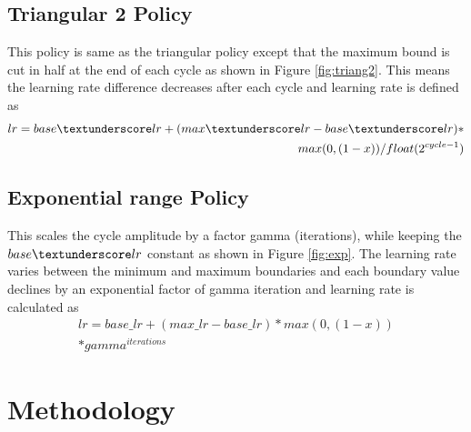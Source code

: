 \documentclass[journal, a4paper]{IEEEtran}
\begin{document}
    \subsection{Triangular 2 Policy}
    \label{sec:triang2}
    This policy is same as the triangular policy except that the maximum bound is cut in half at the end of each cycle as shown in Figure \ref{fig:triang2}. This means the learning rate difference decreases after each cycle and learning rate is defined as
    \begin{equation}
    \begin{split}
        lr = base\textunderscore lr + (max\_lr - base\_lr)*\\
    max(0, (1-x))/float(2^{cycle-1})
    \end{split}
    \end{equation}

    \subsection{Exponential range Policy}
    \label{sec:exp_range}
    This scales the cycle amplitude by a factor gamma (iterations), while keeping the $base\textunderscore lr$ constant as shown in Figure \ref{fig:exp}. The learning rate varies between the minimum and maximum boundaries and each boundary value declines by an exponential factor of gamma iteration and learning rate is calculated as
    \begin{equation}
    \begin{split}
lr=base\_lr + (max\_lr - base\_lr)* max(0,(1-x))\\
        *gamma^{iterations}            
    \end{split}
        \end{equation}

\section{Methodology}
\label{sec:methodology}
\end{document}
